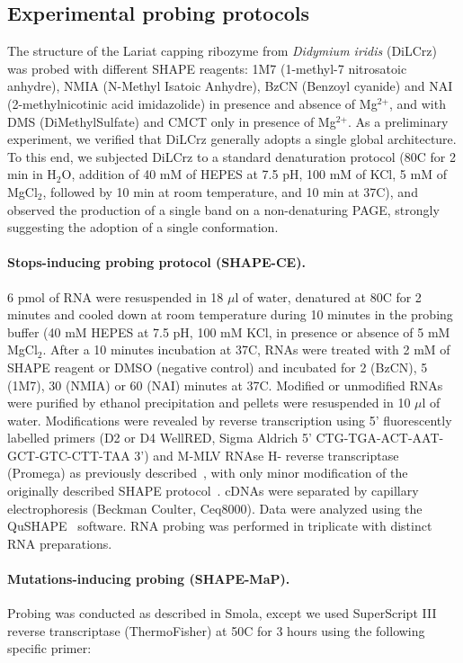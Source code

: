 \documentclass[a4,center,fleqn]{NAR}
\begin{document}
\subsection*{Experimental probing protocols}
The structure of the Lariat capping ribozyme from \textit{Didymium iridis }(DiLCrz) was probed with different SHAPE reagents: 1M7 (1-methyl-7 nitrosatoic anhydre), NMIA (N-Methyl Isatoic Anhydre), BzCN (Benzoyl cyanide) and NAI (2-methylnicotinic acid imidazolide) in presence and absence of Mg$^\text{2+}$, and with DMS (DiMethylSulfate) and CMCT only in presence of Mg$^\text{2+}$.
As a preliminary experiment, we verified that DiLCrz generally adopts a single global architecture. To this end, we subjected DiLCrz to a standard denaturation protocol (80\degree{}C for 2 min in H$_\text{2}$O, addition of 40 mM of HEPES at 7.5 pH, 100 mM of KCl, 5 mM of MgCl$_\text{2}$, followed by 10 min at room temperature, and 10 min at 37\degree{}C), and observed the production of a single band on a non-denaturing PAGE, strongly suggesting the adoption of a single conformation.

\paragraph{Stops-inducing probing protocol (SHAPE-CE).} 
6 pmol of RNA were resuspended in 18 $\mu$l of water, denatured at 80\degree{}C for 2 minutes and cooled down at room temperature during 10 minutes in the probing buffer (40 mM HEPES at 7.5 pH, 100 mM KCl, in presence or absence of 5 mM MgCl$_\text{2}$. After a 10 minutes incubation at 37\degree{}C, RNAs were treated with 2 mM of SHAPE reagent or DMSO (negative control) and incubated for 2 (BzCN), 5 (1M7), 30 (NMIA) or 60 (NAI) minutes at 37\degree{}C. Modified or unmodified RNAs were purified by ethanol precipitation and pellets were resuspended in 10 $\mu$l of water.
Modifications were revealed by reverse transcription using 5’ fluorescently labelled primers (D2 or D4 WellRED, Sigma Aldrich 5’ CTG-TGA-ACT-AAT-GCT-GTC-CTT-TAA 3’) and M-MLV RNAse H- reverse transcriptase (Promega) as previously described~\cite{Deforges2017}, with only minor modification of the originally described SHAPE protocol~\cite{Wilkinson2006}. cDNAs were separated by capillary electrophoresis (Beckman Coulter, Ceq8000). Data were analyzed using the  QuSHAPE~\cite{Karabiber2013} software. RNA probing was performed in triplicate with distinct RNA preparations.

\paragraph{Mutations-inducing probing (SHAPE-MaP).}
Probing was conducted as described in Smola\etal\cite{Smola2015}, except we used SuperScript III reverse transcriptase (ThermoFisher) at 50\degree{}C for 3 hours using the following specific primer: 
\end{document}
